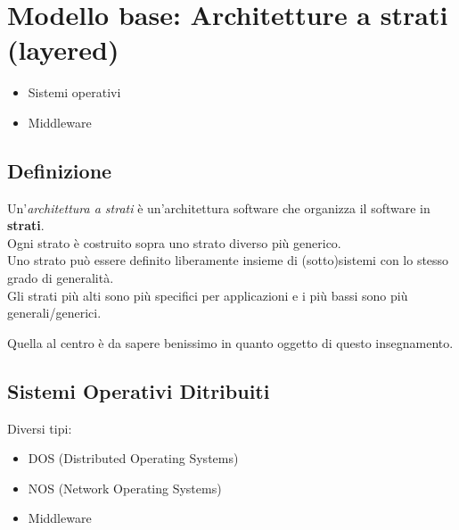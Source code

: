 \section{Modello base: Architetture a strati (layered)}
\begin{itemize}
    \item Sistemi operativi
    \item Middleware
\end{itemize}
\subsection{Definizione}
Un'\textit{architettura a strati} è un'architettura software che organizza il software in \textbf{strati}.
\\Ogni strato è costruito sopra uno strato diverso più generico.
\\Uno strato può essere definito liberamente insieme di (sotto)sistemi con lo stesso grado di generalità.
\\Gli strati più alti sono più specifici per applicazioni e i più bassi sono più generali/generici.

Quella al centro è da sapere benissimo in quanto oggetto di questo insegnamento.

\subsection{Sistemi Operativi Ditribuiti}
Diversi tipi: 
\begin{itemize}
    \item DOS (Distributed Operating Systems)
    \item NOS (Network Operating Systems)
    \item Middleware
\end{itemize}

